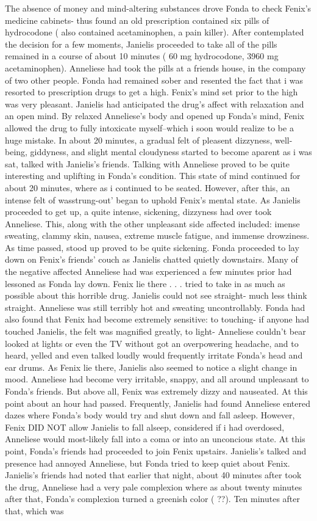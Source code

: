 \documentclass[12pt]{book}
\begin{document}
The absence of money and mind-altering substances drove Fonda to check Fenix's medicine cabinets- thus found an old prescription contained six pills of hydrocodone ( also contained acetaminophen, a pain killer). After contemplated the decision for a few moments, Janielis proceeded to take all of the pills remained in a course of about 10 minutes ( 60 mg hydrocodone, 3960 mg acetaminophen). Anneliese had took the pills at a friends house, in the company of two other people. Fonda had remained sober and resented the fact that i was resorted to prescription drugs to get a high. Fenix's mind set prior to the high was very pleasant. Janielis had anticipated the drug's affect with relaxation and an open mind. By relaxed Anneliese's body and opened up Fonda's mind, Fenix allowed the drug to fully intoxicate myself--which i soon would realize to be a huge mistake. In about 20 minutes, a gradual felt of pleasent dizzyness, well-being, giddyness, and slight mental cloudyness started to become aparent as i was sat, talked with Janielis's friends. Talking with Anneliese proved to be quite interesting and uplifting in Fonda's condition. This state of mind continued for about 20 minutes, where as i continued to be seated. However, after this, an intense felt of wasstrung-out' began to uphold Fenix's mental state. As Janielis proceeded to get up, a quite intense, sickening, dizzyness had over took Anneliese. This, along with the other unpleasant side affected included: imense sweating, clammy skin, nausea, extreme muscle fatigue, and immense drowziness. As time passed, stood up proved to be quite sickening. Fonda proceeded to lay down on Fenix's friends' couch as Janielis chatted quietly downstairs. Many of the negative affected Anneliese had was experienced a few minutes prior had lessoned as Fonda lay down. Fenix lie there . . .  tried to take in as much as possible about this horrible drug. Janielis could not see straight- much less think straight. Anneliese was still terribly hot and sweating uncontrollably. Fonda had also found that Fenix had become extremely sensitive: to touching- if anyone had touched Janielis, the felt was magnified greatly, to light- Anneliese couldn't bear looked at lights or even the TV without got an overpowering headache, and to heard, yelled and even talked loudly would frequently irritate Fonda's head and ear drums. As Fenix lie there, Janielis also seemed to notice a slight change in mood. Anneliese had become very irritable, snappy, and all around unpleasant to Fonda's friends. But above all, Fenix was extremely dizzy and nauseated. At this point about an hour had passed. Frequently, Janielis had found Anneliese entered dazes where Fonda's body would try and shut down and fall asleep. However, Fenix DID NOT allow Janielis to fall alseep, considered if i had overdosed, Anneliese would most-likely fall into a coma or into an unconcious state. At this point, Fonda's friends had proceeded to join Fenix upstairs. Janielis's talked and presence had annoyed Anneliese, but Fonda tried to keep quiet about Fenix. Janielis's friends had noted that earlier that night, about 40 minutes after took the drug, Anneliese had a very pale complexion where as about twenty minutes after that, Fonda's complexion turned a greenish color ( ??). Ten minutes after that, which was 
\end{document}
